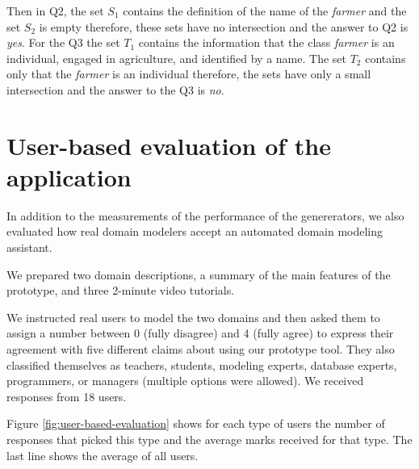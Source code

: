 \noindent{}Then in Q2, the set $S_1$ contains the definition of the name of the \textit{farmer} and the set $S_2$ is empty therefore, these sets have no intersection and the answer to Q2 is \textit{yes}. For the Q3 the set $T_1$ contains the information that the class \textit{farmer} is an individual, engaged in agriculture, and identified by a name. The set $T_2$ contains only that the \textit{farmer} is an individual therefore, the sets have only a small intersection and the answer to the Q3 is \textit{no}.




\section{User-based evaluation of the application}

In addition to the measurements of the performance of the genererators, we also evaluated how real domain modelers accept an automated domain modeling assistant.

We prepared two domain descriptions, a summary of the main features of the prototype, and three 2-minute video tutorials.

We instructed real users to model the two domains and then asked them to assign a number between 0 (fully disagree) and 4 (fully agree) to express their agreement with five different claims about using our prototype tool.
They also classified themselves as teachers, students, modeling experts, database experts, programmers, or managers (multiple options were allowed).
We received responses from 18 users.

Figure \ref{fig:user-based-evaluation} shows for each type of users the number of responses that picked this type and the average marks received for that type. The last line shows the average of all users.

